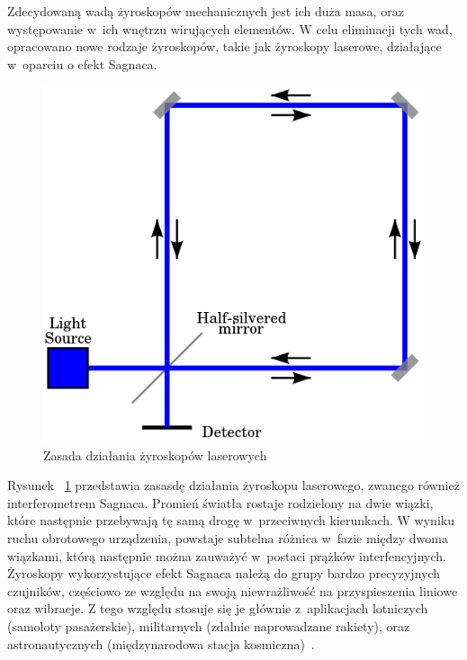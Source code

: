 Zdecydowaną wadą żyroskopów mechanicznych jest ich duża masa, oraz występowanie w~ich wnętrzu wirujących elementów. W celu eliminacji tych wad, opracowano nowe rodzaje żyroskopów, takie jak żyroskopy laserowe, działające w~oparciu o efekt Sagnaca.

\begin{figure}[H]
	\centering
	\includegraphics[scale=0.4]{Pictures/Sagnac_interferometer.png}
        \caption[Zasada działania żyroskopów laserowych]{Zasada działania żyroskopów laserowych~\cite{mems9}}
        \label{fig:300px-SagnacPhase}
\end{figure}

Rysunek ~\ref{fig:300px-SagnacPhase} przedstawia zasasdę działania żyroskopu laserowego, zwanego również interferometrem Sagnaca. Promień światła rostaje rodzielony na dwie wiązki, które następnie przebywają tę samą drogę w~przeciwnych kierunkach. W wyniku ruchu obrotowego urządzenia, powstaje subtelna różnica w~fazie między dwoma wiązkami, którą następnie można zauważyć w~postaci prążków interfencyjnych. Żyroskopy wykorzystujące efekt Sagnaca należą do grupy bardzo precyzyjnych czujników, częściowo ze względu na swoją niewrażliwość na przyspieszenia liniowe oraz wibracje. Z tego względu stosuje się je głównie z~aplikacjach lotniczych (samoloty pasażerskie), militarnych (zdalnie naprowadzane rakiety), oraz astronautycznych (międzynarodowa stacja kosmiczna)~\cite{mems7, mems8}. 

